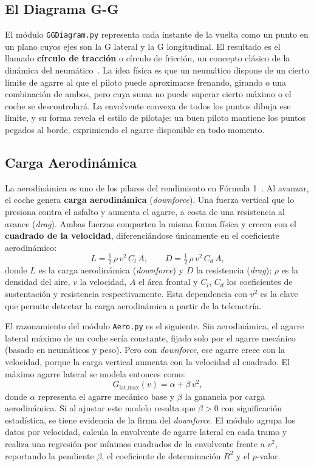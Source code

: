 \documentclass[12pt,a4paper,twoside,openright]{book}
\begin{document}
\subsection{El Diagrama G-G}
El módulo \texttt{GGDiagram.py} representa cada instante de la vuelta como un punto en un plano cuyos ejes son la G lateral y la G longitudinal. El resultado es el llamado \textbf{círculo de tracción} o círculo de fricción, un concepto clásico de la dinámica del neumático~\cite{pacejka2012}. La idea física es que un neumático dispone de un cierto límite de agarre al que el piloto puede aproximarse frenando, girando o una combinación de ambos, pero cuya suma no puede superar cierto máximo o el coche se descontrolará. La envolvente convexa de todos los puntos dibuja ese límite, y su forma revela el estilo de pilotaje: un buen piloto mantiene los puntos pegados al borde, exprimiendo el agarre disponible en todo momento.


\subsection{Carga Aerodinámica}
La aerodinámica es uno de los pilares del rendimiento en Fórmula 1~\cite{katz2006}. Al avanzar, el coche genera \textbf{carga aerodinámica} (\textit{downforce}). Una fuerza vertical que lo presiona contra el asfalto y aumenta el agarre, a costa de una resistencia al avance (\textit{drag}). Ambas fuerzas comparten la misma forma física y crecen con el \textbf{cuadrado de la velocidad}, diferenciándose únicamente en el coeficiente aerodinámico:
\begin{equation}
L = \tfrac{1}{2}\,\rho\,v^2\,C_l\,A, \qquad D = \tfrac{1}{2}\,\rho\,v^2\,C_d\,A,
\end{equation}
donde $L$ es la carga aerodinámica (\textit{downforce}) y $D$ la resistencia (\textit{drag}); $\rho$ es la densidad del aire, $v$ la velocidad, $A$ el área frontal y $C_l$, $C_d$ los coeficientes de sustentación y resistencia respectivamente. Esta dependencia con $v^2$ es la clave que permite detectar la carga aerodinámica a partir de la telemetría.

\medskip
\noindent El razonamiento del módulo \texttt{Aero.py} es el siguiente. Sin aerodinámica, el agarre lateral máximo de un coche sería constante, fijado solo por el agarre mecánico (basado en neumáticos y peso). Pero con \textit{downforce}, ese agarre crece con la velocidad, porque la carga vertical aumenta con la velocidad al cuadrado. El máximo agarre lateral se modela entonces como:
\begin{equation}
G_{\text{lat,max}}(v) = \alpha + \beta \, v^2,
\end{equation}
donde $\alpha$ representa el agarre mecánico base y $\beta$ la ganancia por carga aerodinámica. Si al ajustar este modelo resulta que $\beta > 0$
con significación estadística, se tiene evidencia de la firma del \textit{downforce}. El módulo agrupa los datos por velocidad, calcula la envolvente de agarre lateral en cada tramo y realiza una regresión por mínimos cuadrados de la envolvente frente a $v^2$, reportando la pendiente $\beta$, el coeficiente de determinación $R^2$ y el $p$-valor.
\end{document}
